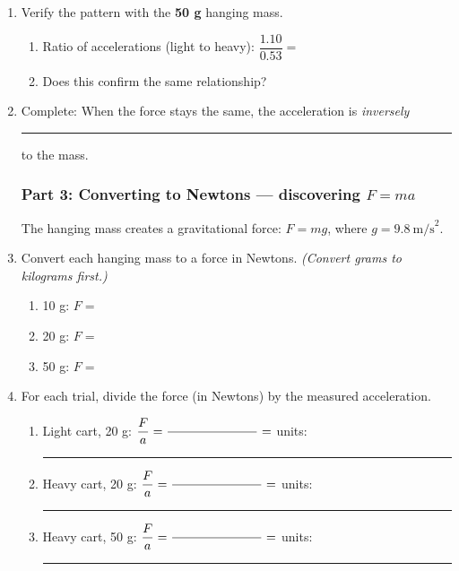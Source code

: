 \documentclass[12pt, twoside]{article}
\begin{document}
\begin{enumerate}[itemsep=0.25cm]
\item Verify the pattern with the \textbf{50 g} hanging mass.
  \begin{enumerate}[itemsep=0.5cm]
    \item Ratio of accelerations (light to heavy): \quad $\dfrac{1.10}{0.53} = $
    \item Does this confirm the same relationship?
  \end{enumerate}
  \vspace{0.5cm}

\item Complete: When the force stays the same, the acceleration is \textit{inversely} \rule{4cm}{0.4pt} to the mass.

\newpage
\subsubsection*{Part 3: Converting to Newtons --- discovering $F = ma$}

The hanging mass creates a gravitational force: $F = mg$, where $g = 9.8~\text{m/s}^2$.

\item Convert each hanging mass to a force in Newtons. \textit{(Convert grams to kilograms first.)}
  \begin{enumerate}[itemsep=1.25cm]
    \item 10 g: \quad $F = $
    \item 20 g: \quad $F = $
    \item 50 g: \quad $F = $
  \end{enumerate}
  \vspace{0.5cm}

\item For each trial, divide the force (in Newtons) by the measured acceleration.
  \begin{enumerate}[itemsep=1.75cm]
    \item Light cart, 20 g: \quad $\dfrac{F}{a} = \dfrac{\hspace{2.5cm}}{\hspace{2.5cm}} = $ \hfill units: \rule{2cm}{0.4pt}
    \item Heavy cart, 20 g: \quad $\dfrac{F}{a} = \dfrac{\hspace{2.5cm}}{\hspace{2.5cm}} = $ \hfill units: \rule{2cm}{0.4pt}
    \item Heavy cart, 50 g: \quad $\dfrac{F}{a} = \dfrac{\hspace{2.5cm}}{\hspace{2.5cm}} = $ \hfill units: \rule{2cm}{0.4pt}
  \end{enumerate}
  \vspace{0.5cm}


\end{enumerate}
\end{document}
